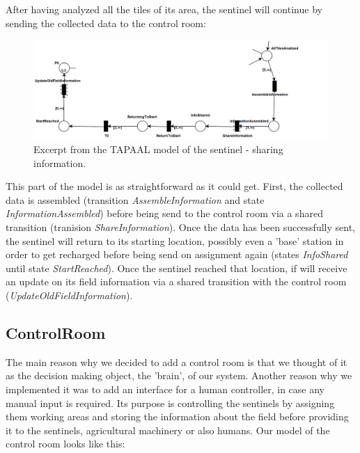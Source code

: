 \documentclass[english]{lni}
\begin{document}
After having analyzed all the tiles of its area, the sentinel will continue by sending the collected data to the control room:

\begin{figure}[H]
    \centering
    \includegraphics[width = 12cm]{img/sentinel_part3.png}
    \caption{Excerpt from the TAPAAL model of the sentinel - sharing information.}
    \label{fig:sentinel_3}
\end{figure}
This part of the model is as straightforward as it could get. First, the collected data is assembled (transition \textit{AssembleInformation} and state \textit{InformationAssembled}) before being send to the control room via a shared transition (tranision \textit{ShareInformation}). Once the data has been successfully sent, the sentinel will return to its starting location, possibly even a 'base' station in order to get recharged before being send on assignment again (states \textit{InfoShared} until state \textit{StartReached}). Once the sentinel reached that location, if will receive an update on its field information via a shared transition with the control room (\textit{UpdateOldFieldInformation}).\\

\subsection{ControlRoom}\label{sec:contRoom}
The main reason why we decided to add a control room is that we thought of it as the decision making object, the 'brain', of our system. Another reason why we implemented it was to add an interface for a human controller, in case any manual input is required. Its purpose is controlling the sentinels by assigning them working areas and storing the information about the field before providing it to the sentinels, agricultural machinery or also humans. Our model of the control room looks like this:
\end{document}
